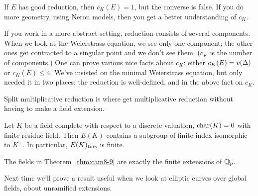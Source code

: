 \begin{rem}
If $E$ has good reduction, then $c_K(E)=1$, but the converse is false. If you do more geometry, using Neron models, then you get a better understanding of $c_K$.

If you work in a more abstract setting, reduction consists of several components. When we look at the Weierstrass equation, we see only one component; the other ones get contracted to a singular point and we don't see them. ($c_K$ is the number of components.) One can prove various nice facts about $c_K$: either $c_K(E)=v(\Delta)$ or $c_K(E)\le 4$. We've insisted on the minimal Weierstrass equation, but only needed it in two places: the reduction is well-defined, and in the above fact on $c_K$.

Split multiplicative reduction is where get multiplicative reduction without having to make a field extension.
\end{rem}
\begin{thm}
Let $K$ be a field complete with respect to a discrete valuation, $\operatorname{char}(K)=0$ with finite residue field. Then $E(K)$ contains a subgroup of finite index isomorphic to $K^+$. 
In particular, $E(K)_{\text{tors}}$ is finite.
\end{thm}
\begin{rem}
The fields in Theorem~\ref{thm:cam8-9} are exactly the finite extensions of $\mathbb{Q}_p$. 
\end{rem}
Next time we'll prove a result useful when we look at elliptic curves over global fields, about unramified extensions.

